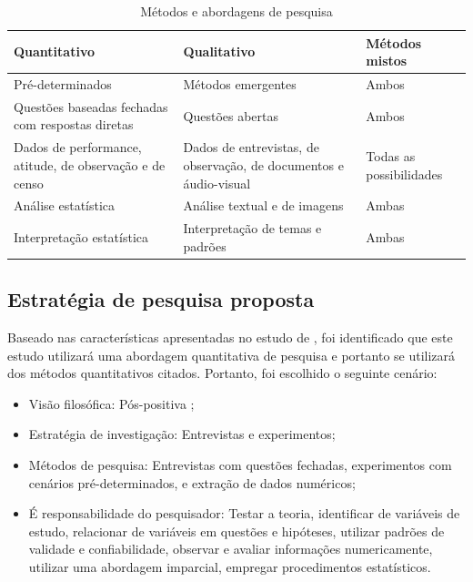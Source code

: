     \begin{center}
        \begin{table}[!htp]
            \caption{Métodos e abordagens de pesquisa}
            \label{tab:metodos_pesquisa}
            \begin{tabular}{|p{4.5cm}|p{5cm}|p{5cm}|}
                \hline
                Quantitativo                      & Qualitativo                     & Métodos mistos   \\
                \hline
                Pré-determinados              & Métodos emergentes          & Ambos \\
                \hline
                Questões baseadas fechadas com respostas diretas & Questões abertas       & Ambos    \\
                \hline
                Dados de performance, atitude, de observação e de censo  & Dados de entrevistas, de observação, de documentos e áudio-visual       &  Todas as possibilidades    \\
                \hline
                Análise estatística & Análise textual e de imagens       &  Ambas   \\
                \hline
                Interpretação estatística  & Interpretação de temas e padrões       & Ambas    \\
                \hline
            \end{tabular}
        \end{table}
    \end{center}

\subsection{Estratégia de pesquisa proposta}

Baseado nas características apresentadas no estudo de \cite{creswell_research_2014}, foi identificado que este estudo utilizará uma abordagem quantitativa de pesquisa e portanto se utilizará dos métodos quantitativos citados. Portanto, foi escolhido o seguinte cenário:

\begin{itemize}
    \item Visão filosófica: Pós-positiva ;
    \item Estratégia de investigação: Entrevistas e experimentos;
    \item Métodos de pesquisa: Entrevistas com questões fechadas, experimentos com cenários pré-determinados, e extração de dados numéricos;
    \item É responsabilidade do pesquisador: Testar a teoria, identificar de variáveis de estudo, relacionar de variáveis em questões e hipóteses, utilizar padrões de validade e confiabilidade, observar e avaliar informações numericamente, utilizar uma abordagem imparcial, empregar procedimentos estatísticos.
\end{itemize}